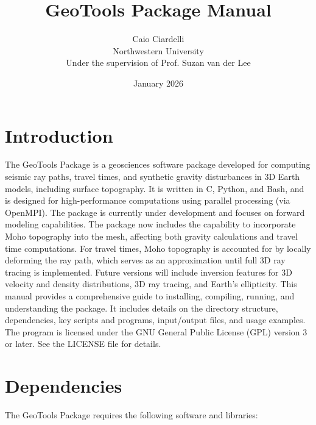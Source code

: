\documentclass[12pt,a4paper]{article}
\title{GeoTools Package Manual}
\author{Caio Ciardelli \\ Northwestern University \\ Under the supervision of Prof. Suzan van der Lee}
\date{January 2026}
\begin{document}
\maketitle
\tableofcontents
\newpage
\section{Introduction}
The GeoTools Package is a geosciences software package developed for computing seismic ray paths, travel times, and synthetic gravity disturbances in 3D Earth models, including surface topography. It is written in C, Python, and Bash, and is designed for high-performance computations using parallel processing (via OpenMPI). The package is currently under development and focuses on forward modeling capabilities. The package now includes the capability to incorporate Moho topography into the mesh, affecting both gravity calculations and travel time computations. For travel times, Moho topography is accounted for by locally deforming the ray path, which serves as an approximation until full 3D ray tracing is implemented. Future versions will include inversion features for 3D velocity and density distributions, 3D ray tracing, and Earth's ellipticity.
This manual provides a comprehensive guide to installing, compiling, running, and understanding the package. It includes details on the directory structure, dependencies, key scripts and programs, input/output files, and usage examples.
The program is licensed under the GNU General Public License (GPL) version 3 or later. See the LICENSE file for details.

\section{Dependencies}
The GeoTools Package requires the following software and libraries:
\end{document}
